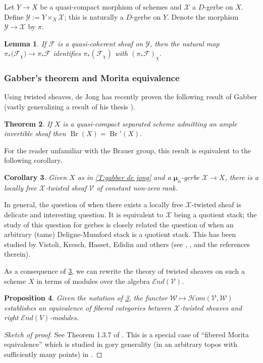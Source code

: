 \documentclass[11pt]{amsart}
\newcommand{\ms}[1]{\mathscr #1}
\newcommand{\shom}{\ms H\!om}
\newcommand{\send}{\ms E\!nd}
\newcommand{\m}{\boldsymbol{\mu}}
\renewcommand{\[}{[\!\hspace{0.03em}[}
\renewcommand{\]}{]\!\hspace{0.03em}]}
\renewcommand{\(}{(\!\hspace{0.03em}(}
\renewcommand{\)}{)\!\hspace{0.03em})}
\DeclareMathOperator{\Br}{\operatorname{Br}}
\newtheorem{lem}{Lemma}[subsubsection]%
\newtheorem{thm}[lem]{Theorem}
\newtheorem{prop}[lem]{Proposition}
\newtheorem{cor}[lem]{Corollary}
\theoremstyle{definition}
\theoremstyle{remark}
\begin{document}
Let $Y\to X$ be a quasi-compact morphism of schemes and $\ms X$ a $D$-gerbe on $X$.  
Define $\ms Y:=Y\times_{X}\ms X$; this is naturally a $D$-gerbe on 
$Y$.  Denote the morphism $\ms Y\to\ms X$ by $\pi$.

\begin{lem}\label{L:q-coh split is natural} If $\ms F$ is 
a quasi-coherent sheaf on $\ms Y$, then the natural map $\pi_{\ast}\ms 
(\ms F_{\chi})\to\pi_{\ast}\ms F$ identifies $\pi_{\ast}(\ms F_{\chi})$ 
with $(\pi_{\ast}\ms F)_{\chi}$.
\end{lem}

\subsubsection{Gabber's theorem and Morita equivalence}\label{S:gabber's theorems}

Using twisted sheaves, de Jong \cite{dejong-gabber} has recently proven the following 
result of Gabber (vastly generalizing a result of his thesis 
\cite{gabber}).

\begin{thm}\label{T:gabber de jong} If $X$ is a quasi-compact separated 
scheme admitting an ample invertible sheaf then $\Br(X)=\Br'(X)$.
\end{thm}

For the reader unfamiliar with the Brauer group, this result is 
equivalent to the following corollary.

\begin{cor}\label{C:gabber de jong} Given $X$ as in \ref{T:gabber de 
jong} and a $\m_{n}$-gerbe $\ms X\to X$, there is a locally free $\ms 
X$-twisted sheaf $\ms V$ of constant non-zero rank.
\end{cor}

In general, the question of when there exists a locally free $\ms 
X$-twisted sheaf is delicate and interesting question.  It is 
equivalent to $\ms X$ being a quotient stack; the study of this 
question for gerbes is closely related the question of when an arbitrary  
(tame) Deligne-Mumford stack is a quotient stack.  This has been 
studied by Vistoli, Kresch, Hasset, Edidin and others (see 
\cite{vistoli-kresch}, \cite{vistoli-kresch-etc}, \cite{totaro} and 
the references therein).

As a consequence of \ref{C:gabber de jong}, we can rewrite the 
theory of twisted sheaves on such a scheme $X$ in terms of modules 
over the algebra $\send(\ms V)$.

\begin{prop}\label{P:mini-morita} Given the notation of \ref{C:gabber de jong}, the 
functor $\ms W\mapsto\shom(\ms V,\ms W)$ establishes an equivalence of 
fibered categories between $\ms X$-twisted sheaves and right 
$\send(V)$-modules.
\end{prop}
\begin{proof}[Sketch of proof] See Theorem 1.3.7 of \cite{caldararu}.  This is a special case of ``fibered Morita 
equivalence'' which is studied in gory generality (in an arbitrary 
topos with sufficiently many points) in \cite{mythesis}.
\end{proof}
\end{document}
